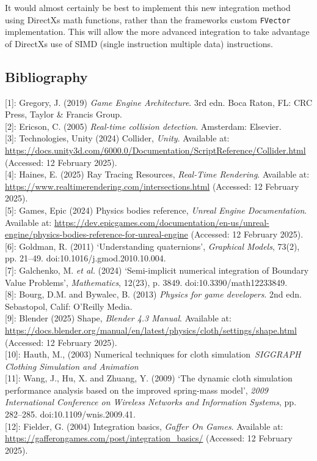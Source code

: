 \documentclass[
]{article}
\begin{document}
It would almost certainly be best to implement this new integration
method using DirectX\textquotesingle s math functions, rather than the
framework\textquotesingle s custom \texttt{FVector} implementation. This
will allow the more advanced integration to take advantage of
DirectX\textquotesingle s use of SIMD (single instruction multiple data)
instructions.

\subsection{Bibliography}\label{bibliography}

{[}1{]}: Gregory, J. (2019) \emph{Game Engine Architecture}. 3rd edn.
Boca Raton, FL: CRC Press, Taylor \& Francis Group.\\
{[}2{]}: Ericson, C. (2005) \emph{Real-time collision detection}.
Amsterdam: Elsevier.\\
{[}3{]}: Technologies, Unity (2024)
\textquotesingle Collider\textquotesingle, \emph{Unity}. Available at:
\url{https://docs.unity3d.com/6000.0/Documentation/ScriptReference/Collider.html}
(Accessed: 12 February 2025).\\
{[}4{]}: Haines, E. (2025) \textquotesingle Ray Tracing
Resources\textquotesingle, \emph{Real-Time Rendering}. Available at:
\url{https://www.realtimerendering.com/intersections.html} (Accessed: 12
February 2025).\\
{[}5{]}: Games, Epic (2024) \textquotesingle Physics bodies
reference\textquotesingle, \emph{Unreal Engine Documentation}. Available
at:
\url{https://dev.epicgames.com/documentation/en-us/unreal-engine/physics-bodies-reference-for-unreal-engine}
(Accessed: 12 February 2025).\\
{[}6{]}: Goldman, R. (2011) `Understanding quaternions', \emph{Graphical
Models}, 73(2), pp. 21--49. doi:10.1016/j.gmod.2010.10.004.\\
{[}7{]}: Galchenko, M. \emph{et al.} (2024) `Semi-implicit numerical
integration of Boundary Value Problems', \emph{Mathematics}, 12(23), p.
3849. doi:10.3390/math12233849.\\
{[}8{]}: Bourg, D.M. and Bywalec, B. (2013) \emph{Physics for game
developers}. 2nd edn. Sebastopol, Calif: O'Reilly Media.\\
{[}9{]}: Blender (2025) \textquotesingle Shape\textquotesingle,
\emph{Blender 4.3 Manual}. Available at:
\url{https://docs.blender.org/manual/en/latest/physics/cloth/settings/shape.html}
(Accessed: 12 February 2025).\\
{[}10{]}: Hauth, M., (2003) \textquotesingle Numerical techniques for
cloth simulation\textquotesingle~\emph{SIGGRAPH
\textquotesingle Clothing Simulation and Animation\textquotesingle{}}\\
{[}11{]}: Wang, J., Hu, X. and Zhuang, Y. (2009) `The dynamic cloth
simulation performance analysis based on the improved spring-mass
model', \emph{2009 International Conference on Wireless Networks and
Information Systems}, pp. 282--285. doi:10.1109/wnis.2009.41.\\
{[}12{]}: Fielder, G. (2004) \textquotesingle Integration
basics\textquotesingle, \emph{Gaffer On Games}. Available at:
\url{https://gafferongames.com/post/integration_basics/} (Accessed: 12
February 2025).
\end{document}
